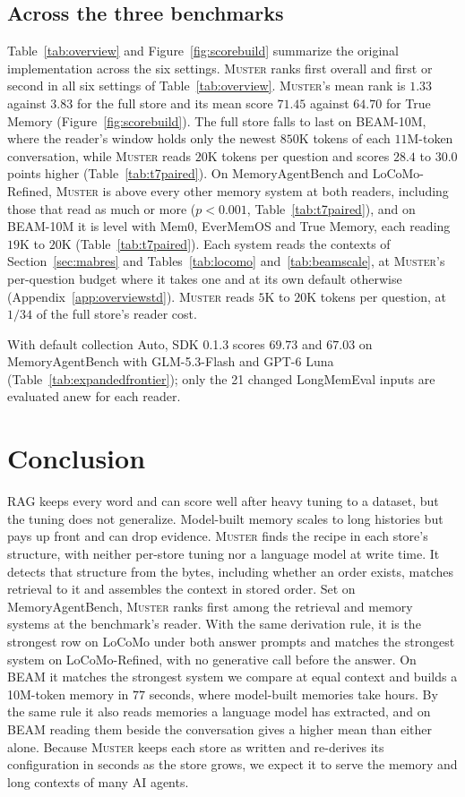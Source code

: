 \documentclass{article}
\newcommand{\sys}{\textsc{Muster}}
\begin{document}
\subsection{Across the three benchmarks}\label{sec:across}

Table~\ref{tab:overview} and Figure~\ref{fig:scorebuild} summarize the original implementation across the six settings. \sys{} ranks first overall and first or second in all six settings of Table~\ref{tab:overview}. \sys{}'s mean rank is $1.33$ against $3.83$ for the full store and its mean score $71.45$ against $64.70$ for True Memory (Figure~\ref{fig:scorebuild}). The full store falls to last on BEAM-10M, where the reader's window holds only the newest $850$K tokens of each $11$M-token conversation, while \sys{} reads $20$K tokens per question and scores $28.4$ to $30.0$ points higher (Table~\ref{tab:t7paired}). On MemoryAgentBench and LoCoMo-Refined, \sys{} is above every other memory system at both readers, including those that read as much or more ($p<0.001$, Table~\ref{tab:t7paired}), and on BEAM-10M it is level with Mem0, EverMemOS and True Memory, each reading $19$K to $20$K (Table~\ref{tab:t7paired}). Each system reads the contexts of Section~\ref{sec:mabres} and Tables~\ref{tab:locomo} and~\ref{tab:beamscale}, at \sys{}'s per-question budget where it takes one and at its own default otherwise (Appendix~\ref{app:overviewstd}). \sys{} reads $5$K to $20$K tokens per question, at $1/34$ of the full store's reader cost.

With default collection Auto, SDK 0.1.3 scores $69.73$ and $67.03$ on MemoryAgentBench with GLM-5.3-Flash and GPT-6 Luna (Table~\ref{tab:expandedfrontier}); only the 21 changed LongMemEval inputs are evaluated anew for each reader.

\FloatBarrier
\section{Conclusion}

RAG keeps every word and can score well after heavy tuning to a dataset, but the tuning does not generalize. Model-built memory scales to long histories but pays up front and can drop evidence. \sys{} finds the recipe in each store's structure, with neither per-store tuning nor a language model at write time. It detects that structure from the bytes, including whether an order exists, matches retrieval to it and assembles the context in stored order. Set on MemoryAgentBench, \sys{} ranks first among the retrieval and memory systems at the benchmark's reader. With the same derivation rule, it is the strongest row on LoCoMo under both answer prompts and matches the strongest system on LoCoMo-Refined, with no generative call before the answer. On BEAM it matches the strongest system we compare at equal context and builds a 10M-token memory in $77$ seconds, where model-built memories take hours. By the same rule it also reads memories a language model has extracted, and on BEAM reading them beside the conversation gives a higher mean than either alone. Because \sys{} keeps each store as written and re-derives its configuration in seconds as the store grows, we expect it to serve the memory and long contexts of many AI agents.
\end{document}
